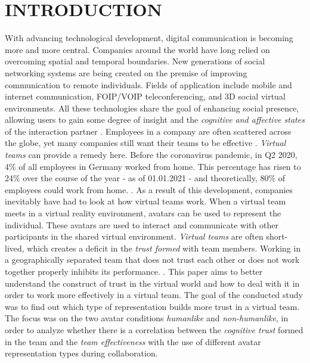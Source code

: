 \documentclass[sigchi]{acmart}
\begin{document}
\maketitle

\section{INTRODUCTION}
With advancing technological development, digital communication is becoming more and more central. Companies around the world have long relied on overcoming spatial and temporal boundaries.
New generations of social networking systems are being created on the premise of improving communication to remote individuals.
Fields of application include mobile and internet communication, FOIP/VOIP teleconferencing, and 3D social virtual environments.
All these technologies share the goal of enhancing social presence, allowing users to gain some degree of insight and the \textit{cognitive and affective states} of the interaction partner \citep[p. 3]{biocca2002defining}.
Employees in a company are often scattered across the globe, yet many companies still want their teams to be effective \citep[p. 791-792]{jarvenpaa1999communication}. \textit{Virtual teams} can provide a remedy here. 
Before the coronavirus pandemic, in Q2 2020, 4\% of all employees in Germany worked from home. This percentage has risen to 24\% over the course of the year - as of 01.01.2021 - and theoretically, 80\% of employees could work from home. \citep{statistaCorona2020}. As a result of this development, companies inevitably have had to look at how virtual teams work.
When a virtual team meets in a virtual reality environment, avatars can be used to represent the individual. These avatars are used to interact and communicate with other participants in the shared virtual environment.
\textit{Virtual teams} are often short-lived, which creates a deficit in the \textit{trust formed} with team members.
Working in a geographically separated team that does not trust each other or does not work together properly inhibits its performance. \citep[p. 98-107]{huang1998supporting} \citep[p. 399-417]{turoff1993distributed}. This paper aims to better understand the construct of trust in the virtual world and how to deal with it in order to work more effectively in a virtual team.
The goal of the conducted study was to find out which type of representation builds more trust in a virtual team. The focus was on the two avatar conditions \textit{humanlike} and \textit{non-humanlike}, in order to analyze whether there is a correlation between the \textit{cognitive trust} formed in the team and the \textit{team effectiveness} with the use of different avatar representation types during collaboration.
\end{document}
